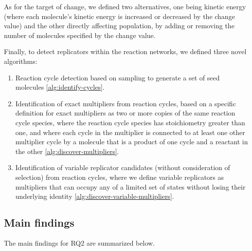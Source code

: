 As for the target of change, we defined two alternatives, one being kinetic energy (where each molecule's kinetic energy is increased or decreased by the change value) and the other directly affecting population, by adding or removing the number of molecules specified by the change value.

Finally, to detect replicators within the reaction networks, we defined three novel algorithms:
\begin{enumerate}
\item Reaction cycle detection based on sampling to generate a set of seed molecules \cref{alg:identify-cycles}.
\item Identification of exact multipliers from reaction cycles, based on a specific definition for exact multipliers as two or more copies of the same reaction cycle species, where the reaction cycle species has stoichiometry greater than one, and where each cycle in the multiplier is connected to at least one other multiplier cycle by a molecule that is a product of one cycle and a reactant in the other \cref{alg:discover-multipliers}.
\item Identification of variable replicator candidates (without consideration of selection) from reaction cycles, where we define variable replicators as multipliers that can occupy any of a limited set of states without losing their underlying identity \cref{alg:discover-variable-multipliers}.
\end{enumerate}

\subsection{Main findings}

The main findings for RQ2 are summarized below.

